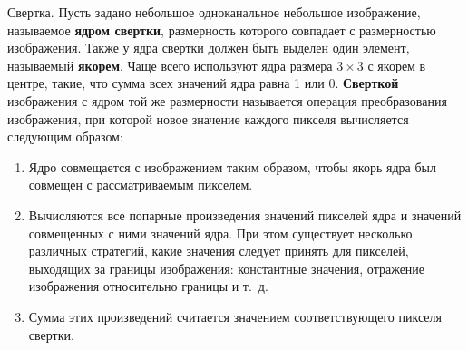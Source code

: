 \begin{definition}{Свертка.}
    Пусть задано небольшое одноканальное небольшое изображение, называемое \textbf{ядром свертки}, размерность которого совпадает с размерностью изображения. Также у ядра свертки должен быть выделен один элемент, называемый \textbf{якорем}. Чаще всего используют ядра размера $3 \times 3$ с якорем в центре, такие, что сумма всех значений ядра равна 1 или 0. \textbf{Сверткой} изображения с ядром той же размерности называется операция преобразования изображения, при которой новое значение каждого пикселя вычисляется следующим образом:
    \begin{enumerate}
    \item
        Ядро совмещается с изображением таким образом, чтобы якорь ядра был совмещен с рассматриваемым пикселем.
    \item
        Вычисляются все попарные произведения значений пикселей ядра и значений совмещенных с ними значений ядра. При этом существует несколько различных стратегий, какие значения следует принять для пикселей, выходящих за границы изображения: константные значения, отражение изображения относительно границы и т.~д.
    \item
        Сумма этих произведений считается значением соответствующего пикселя свертки.
    \end{enumerate}
\end{definition}

